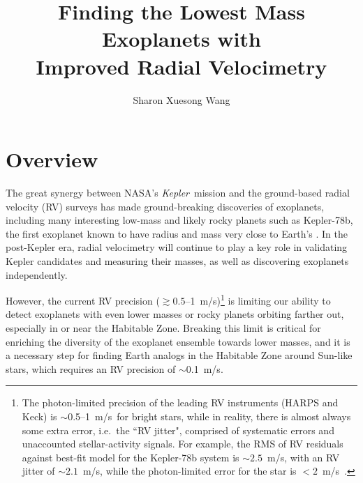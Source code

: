 \documentclass[12pt]{article}
\def\mps{m/s}
\def\kepler{{\it Kepler}}
\begin{document}

\title{\vspace{-45pt} \bf \Large Finding the Lowest Mass Exoplanets with
  \\ Improved Radial Velocimetry \vspace{-15pt}}
\author{\normalsize Sharon Xuesong Wang}
\date{}
\maketitle

\vspace{-48pt}
\section{Overview}
\vspace{-5pt}

The great synergy between NASA's \kepler\ mission and the ground-based
radial velocity (RV) surveys has made ground-breaking discoveries of
exoplanets, including many interesting low-mass \citep{marcy2014} and
likely rocky planets \citep{weiss2013} such as Kepler-78b, the first
exoplanet known to have radius and mass very close to Earth's
\citep{howard2013,pepe2013}. In the post-Kepler era, radial
velocimetry will continue to play a key role in validating Kepler
candidates and measuring their masses, as well as discovering
exoplanets independently.

However, the current RV precision ($\gtrsim
0.5$--1~\mps)\footnote{The photon-limited precision of the leading RV
  instruments (HARPS and Keck) is $\sim$0.5--1~\mps\ for bright stars,
  while in reality, there is almost always some extra error, i.e.~the
  ``RV jitter", comprised of systematic errors and unaccounted
  stellar-activity signals. For example, the RMS of RV residuals
  against best-fit model for the Kepler-78b system is $\sim 2.5$~\mps,
  with an RV jitter of $\sim 2.1$~\mps, while the photon-limited error
  for the star is $<2$~\mps\ \citep{howard2013,pepe2013}.} is limiting
our ability to detect exoplanets with even lower masses or rocky
planets orbiting farther out, especially in or near the Habitable
Zone. Breaking this limit is critical for enriching the diversity of
the exoplanet ensemble towards lower masses, and it is a necessary
step for finding Earth analogs in the Habitable Zone around Sun-like
stars, which requires an RV precision of $\sim$0.1~\mps.
\end{document}
